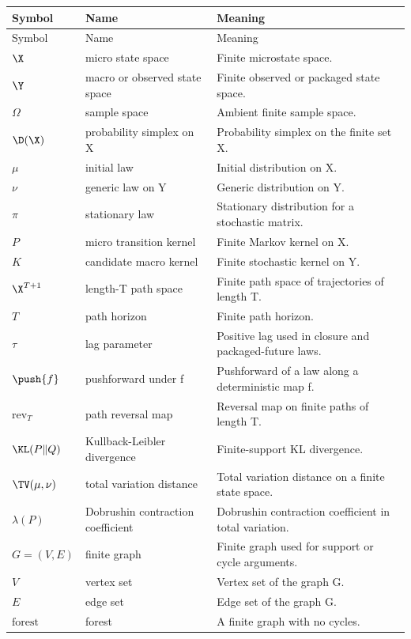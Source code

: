 \begin{longtable}{p{}p{}p{}}
\toprule
Symbol & Name & Meaning \\
\midrule
\endfirsthead
\toprule
Symbol & Name & Meaning \\
\midrule
\endhead
$\X$ & micro state space & Finite microstate space. \\
$\Y$ & macro or observed state space & Finite observed or packaged state space. \\
$\Omega$ & sample space & Ambient finite sample space. \\
$\D(\X)$ & probability simplex on X & Probability simplex on the finite set X. \\
$\mu$ & initial law & Initial distribution on X. \\
$\nu$ & generic law on Y & Generic distribution on Y. \\
$\pi$ & stationary law & Stationary distribution for a stochastic matrix. \\
$P$ & micro transition kernel & Finite Markov kernel on X. \\
$K$ & candidate macro kernel & Finite stochastic kernel on Y. \\
$\X^{T+1}$ & length-T path space & Finite path space of trajectories of length T. \\
$T$ & path horizon & Finite path horizon. \\
$\tau$ & lag parameter & Positive lag used in closure and packaged-future laws. \\
$\push{f}$ & pushforward under f & Pushforward of a law along a deterministic map f. \\
$\mathrm{rev}_T$ & path reversal map & Reversal map on finite paths of length T. \\
$\KL(P\|Q)$ & Kullback-Leibler divergence & Finite-support KL divergence. \\
$\TV(\mu,\nu)$ & total variation distance & Total variation distance on a finite state space. \\
$\lambda(P)$ & Dobrushin contraction coefficient & Dobrushin contraction coefficient in total variation. \\
$G=(V,E)$ & finite graph & Finite graph used for support or cycle arguments. \\
$V$ & vertex set & Vertex set of the graph G. \\
$E$ & edge set & Edge set of the graph G. \\
$\text{forest}$ & forest & A finite graph with no cycles. \\

\end{longtable}
